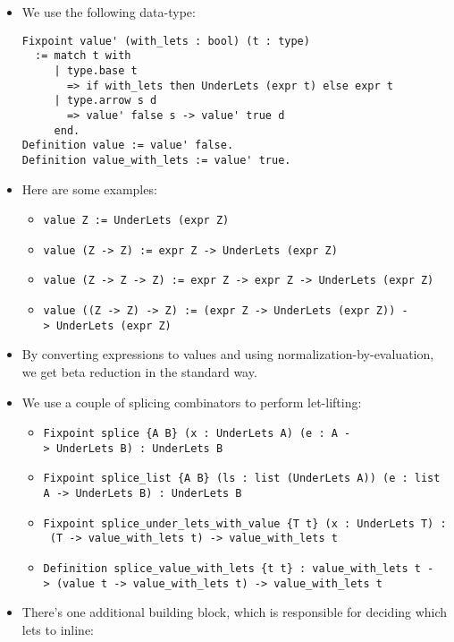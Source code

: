\begin{itemize}
\item
  We use the following data-type:

\begin{verbatim}
Fixpoint value' (with_lets : bool) (t : type)
  := match t with
     | type.base t
       => if with_lets then UnderLets (expr t) else expr t
     | type.arrow s d
       => value' false s -> value' true d
     end.
Definition value := value' false.
Definition value_with_lets := value' true.
\end{verbatim}
\item
  Here are some examples:

  \begin{itemize}
  \tightlist
  \item
    \texttt{value\ Z\ :=\ UnderLets\ (expr\ Z)}
  \item
    \texttt{value\ (Z\ -\textgreater{}\ Z)\ :=\ expr\ Z\ -\textgreater{}\ UnderLets\ (expr\ Z)}
  \item
    \texttt{value\ (Z\ -\textgreater{}\ Z\ -\textgreater{}\ Z)\ :=\ expr\ Z\ -\textgreater{}\ expr\ Z\ -\textgreater{}\ UnderLets\ (expr\ Z)}
  \item
    \texttt{value\ ((Z\ -\textgreater{}\ Z)\ -\textgreater{}\ Z)\ :=\ (expr\ Z\ -\textgreater{}\ UnderLets\ (expr\ Z))\ -\textgreater{}\ UnderLets\ (expr\ Z)}
  \end{itemize}
\item
  By converting expressions to values and using
  normalization-by-evaluation, we get beta reduction in the standard
  way.
\item
  We use a couple of splicing combinators to perform let-lifting:

  \begin{itemize}
  \tightlist
  \item
    \texttt{Fixpoint\ splice\ \{A\ B\}\ (x\ :\ UnderLets\ A)\ (e\ :\ A\ -\textgreater{}\ UnderLets\ B)\ :\ UnderLets\ B}
  \item
    \texttt{Fixpoint\ splice\_list\ \{A\ B\}\ (ls\ :\ list\ (UnderLets\ A))\ (e\ :\ list\ A\ -\textgreater{}\ UnderLets\ B)\ :\ UnderLets\ B}
  \item
    \texttt{Fixpoint\ splice\_under\_lets\_with\_value\ \{T\ t\}\ (x\ :\ UnderLets\ T)\ :\ (T\ -\textgreater{}\ value\_with\_lets\ t)\ -\textgreater{}\ value\_with\_lets\ t}
  \item
    \texttt{Definition\ splice\_value\_with\_lets\ \{t\ t\textquotesingle{}\}\ :\ value\_with\_lets\ t\ -\textgreater{}\ (value\ t\ -\textgreater{}\ value\_with\_lets\ t\textquotesingle{})\ -\textgreater{}\ value\_with\_lets\ t\textquotesingle{}}
  \end{itemize}
\item
  There's one additional building block, which is responsible for
  deciding which lets to inline:


\end{itemize}
